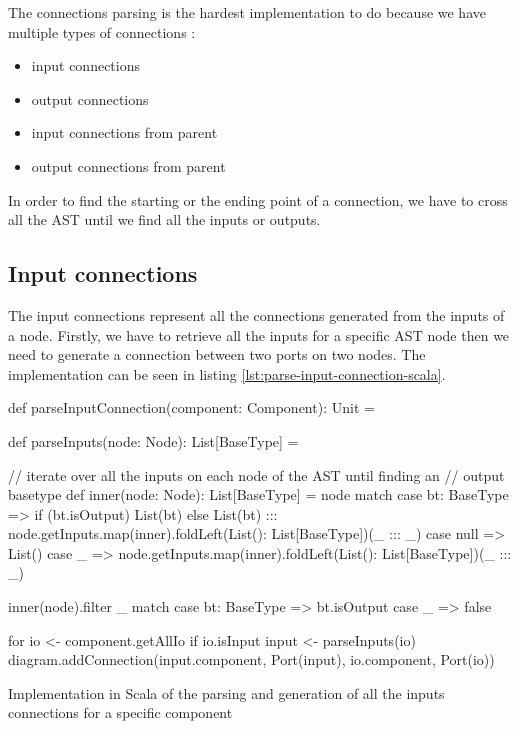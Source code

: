 The connections parsing is the hardest implementation to do because we
have multiple types of connections :
\begin{itemize}
\item input connections
\item output connections
\item input connections from parent
\item output connections from parent
\end{itemize}

In order to find the starting or the ending point of a connection, we have to
cross all the AST until we find all the inputs or outputs.

\subsection{Input connections}
\label{sec:input-connections}

The input connections represent all the connections generated from the inputs of a
node. Firstly, we have to retrieve all the inputs for a specific AST node
then we need to generate a connection between two ports on two nodes. The
implementation can be seen in listing \ref{lst:parse-input-connection-scala}.

\begin{listing}[H]
  \centering
  \begin{scalacode}
  def parseInputConnection(component: Component): Unit = {
      
    def parseInputs(node: Node): List[BaseType] = {
      
      // iterate over all the inputs on each node of the AST until finding an
      // output basetype
      def inner(node: Node): List[BaseType] = node match {
        case bt: BaseType =>
          if (bt.isOutput) List(bt)
          else List(bt) ::: node.getInputs.map(inner).foldLeft(List(): List[BaseType])(_ ::: _)
        case null => List()
        case _ => node.getInputs.map(inner).foldLeft(List(): List[BaseType])(_ ::: _)
      }

      inner(node).filter {
        _ match {
          case bt: BaseType => bt.isOutput
          case _ => false
        }
      }
    }

    for {
      io <- component.getAllIo
      if io.isInput
      input <- parseInputs(io)
    } {
      diagram.addConnection(input.component, Port(input), io.component, Port(io))
    }
  }
  \end{scalacode}
  \caption[Parsing and generation of the inputs connections]{Implementation in
    Scala of the parsing and generation of all the inputs connections for a
    specific component}
  \label{lst:parse-input-connection-scala}
\end{listing}

